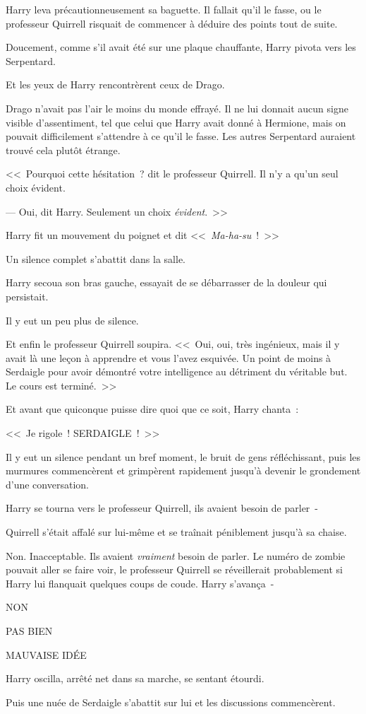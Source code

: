 Harry leva précautionneusement sa baguette. Il fallait qu'il le fasse, ou le professeur Quirrell risquait de commencer à déduire des points tout de suite.

Doucement, comme s'il avait été sur une plaque chauffante, Harry pivota vers les Serpentard.

Et les yeux de Harry rencontrèrent ceux de Drago.

Drago n'avait pas l'air le moins du monde effrayé. Il ne lui donnait aucun signe visible d'assentiment, tel que celui que Harry avait donné à Hermione, mais on pouvait difficilement s'attendre à ce qu'il le fasse. Les autres Serpentard auraient trouvé cela plutôt étrange.

<<~Pourquoi cette hésitation~? dit le professeur Quirrell. Il n'y a qu'un seul choix évident.

--- Oui, dit Harry. Seulement un choix \emph{évident}.~>>

Harry fit un mouvement du poignet et dit <<~\emph{Ma-ha-su}~!~>>

Un silence complet s'abattit dans la salle.

Harry secoua son bras gauche, essayait de se débarrasser de la douleur qui persistait.

Il y eut un peu plus de silence.

Et enfin le professeur Quirrell soupira. <<~Oui, oui, très ingénieux, mais il y avait là une leçon à apprendre et vous l'avez esquivée. Un point de moins à Serdaigle pour avoir démontré votre intelligence au détriment du véritable but. Le cours est terminé.~>>

Et avant que quiconque puisse dire quoi que ce soit, Harry chanta~:

<<~Je rigole~! SERDAIGLE~!~>>

Il y eut un silence pendant un bref moment, le bruit de gens réfléchissant, puis les murmures commencèrent et grimpèrent rapidement jusqu'à devenir le grondement d'une conversation.

Harry se tourna vers le professeur Quirrell, ils avaient besoin de parler~-

Quirrell s'était affalé sur lui-même et se traînait péniblement jusqu'à sa chaise.

Non. Inacceptable. Ils avaient \emph{vraiment} besoin de parler. Le numéro de zombie pouvait aller se faire voir, le professeur Quirrell se réveillerait probablement si Harry lui flanquait quelques coups de coude. Harry s'avança~-

NON

PAS BIEN

MAUVAISE IDÉE

Harry oscilla, arrêté net dans sa marche, se sentant étourdi.

Puis une nuée de Serdaigle s'abattit sur lui et les discussions commencèrent.~
